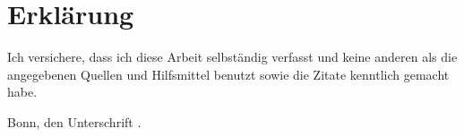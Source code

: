 
\chapter*{Erklärung}

Ich versichere, dass ich diese Arbeit selbständig verfasst und keine anderen als die
angegebenen Quellen und Hilfsmittel benutzt sowie die Zitate kenntlich gemacht habe.

\vspace{10ex}

Bonn, den \hrulefill \hspace{3em} Unterschrift \hrulefill.
